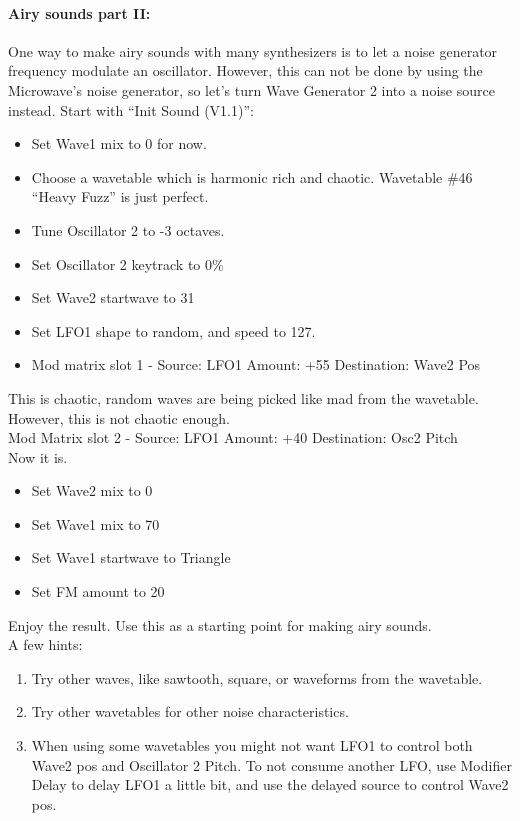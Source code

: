 \paragraph{Airy sounds part II:}
One way to make airy sounds with many synthesizers is to let a noise generator frequency modulate an oscillator. However, this can not be done by using the Microwave's noise generator, so let's turn Wave Generator 2 into a noise source instead. Start with ``Init Sound (V1.1)'':
\begin{itemize}
	\item Set Wave1 mix to 0 for now.
	\item Choose a wavetable which is harmonic rich and chaotic. Wavetable \#46 ``Heavy Fuzz'' is just perfect.
	\item Tune Oscillator 2 to -3 octaves.
	\item Set Oscillator 2 keytrack to 0\%
	\item Set Wave2 startwave to 31
	\item Set LFO1 shape to random, and speed to 127.
	\item Mod matrix slot 1 - Source: LFO1 Amount: +55 Destination: Wave2 Pos
\end{itemize}
This is chaotic, random waves are being picked like mad from the wavetable. However, this is not chaotic enough.\\
Mod Matrix slot 2 - Source: LFO1 Amount: +40 Destination: Osc2 Pitch\\
Now it is.
\begin{itemize}
	\item Set Wave2 mix to 0
	\item Set Wave1 mix to 70
	\item Set Wave1 startwave to Triangle
	\item Set FM amount to 20
\end{itemize}
Enjoy the result. Use this as a starting point for making airy sounds.\\
A few hints:
\begin{enumerate}
	\item Try other waves, like sawtooth, square, or waveforms from the wavetable.
	\item Try other wavetables for other noise characteristics.
	\item When using some wavetables you might not want LFO1 to control both Wave2 pos and Oscillator 2 Pitch. To not consume another LFO, use Modifier Delay to delay LFO1 a little bit, and use the delayed source to control Wave2 pos.
\end{enumerate}
